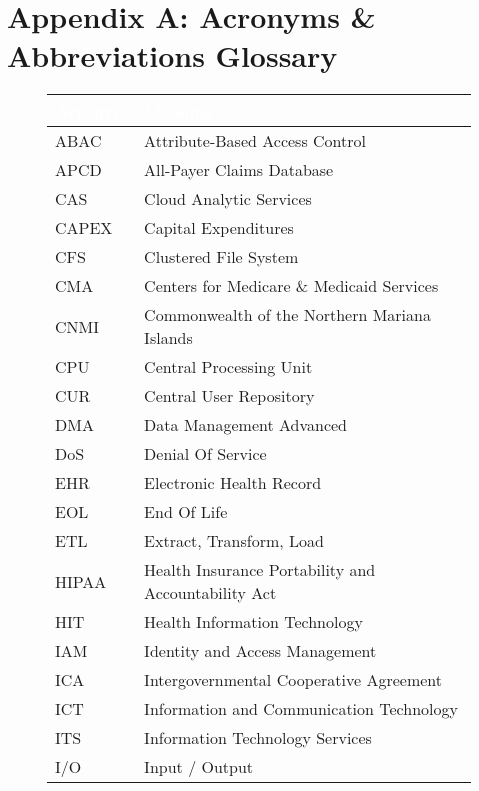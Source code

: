 \section{Appendix A: Acronyms \& Abbreviations Glossary} \label{section: appendix A title}

\begin{figure}[H]
\begin{center}
    \renewcommand{\arraystretch}{1.5}
    \begin{tabular}{|>{\raggedright\arraybackslash}l 
                    |>{\raggedright\arraybackslash}l 
                    |}
    \hline
    \rowcolor[HTML]{196fb4}\centering\textcolor{white}{\large Acronym} 
                            & \centering\textcolor{white}{\large Meaning} 
                            \tabularnewline 
    \hline
    ABAC & Attribute-Based Access Control\\\hline
    APCD & All-Payer Claims Database\\\hline
    CAS & Cloud Analytic Services\\\hline
    CAPEX & Capital Expenditures \\\hline
    CFS & Clustered File System \\\hline
    CMA & Centers for Medicare \& Medicaid Services\\\hline
    CNMI & Commonwealth of the Northern Mariana Islands\\\hline
    CPU & Central Processing Unit\\\hline
    CUR & Central User Repository\\\hline
    DMA & Data Management Advanced\\\hline
    DoS & Denial Of Service \\\hline
    EHR & Electronic Health Record\\\hline
    EOL & End Of Life \\\hline
    ETL & Extract, Transform, Load\\\hline
    HIPAA & Health Insurance Portability and Accountability Act\\\hline
    HIT & Health Information Technology\\\hline
    IAM & Identity and Access Management\\\hline
    ICA & Intergovernmental Cooperative Agreement\\\hline
    ICT & Information and Communication Technology\\\hline
    ITS & Information Technology Services \\\hline
    I/O & Input / Output \\\hline

\end{tabular}
\end{center}
\end{figure}
